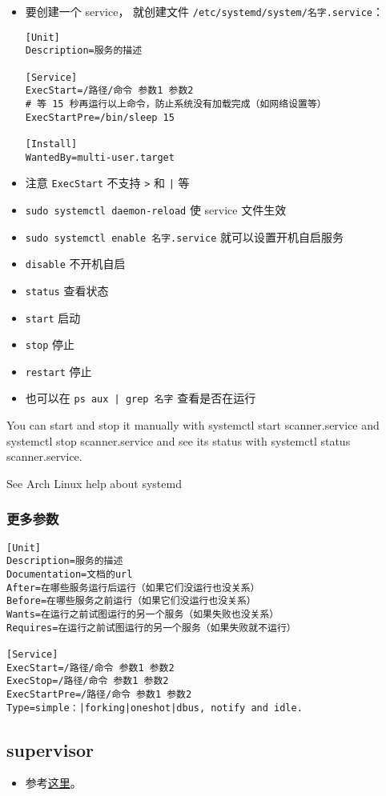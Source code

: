 
\begin{issues}
\issueDraft
\end{issues}

\begin{itemize}
\item 要创建一个 service， 就创建文件 \verb|/etc/systemd/system/名字.service|：
\begin{lstlisting}[language=none,caption=名字.service]
[Unit]
Description=服务的描述

[Service]
ExecStart=/路径/命令 参数1 参数2
# 等 15 秒再运行以上命令，防止系统没有加载完成（如网络设置等）
ExecStartPre=/bin/sleep 15

[Install]
WantedBy=multi-user.target
\end{lstlisting}
\item 注意 \verb|ExecStart| 不支持 \verb|>| 和 \verb`|` 等
\item \verb|sudo systemctl daemon-reload| 使 service 文件生效
\item \verb|sudo systemctl enable 名字.service| 就可以设置开机自启服务
\item \verb|disable| 不开机自启
\item \verb|status| 查看状态
\item \verb|start| 启动
\item \verb|stop| 停止
\item \verb|restart| 停止
\item 也可以在 \verb`ps aux | grep 名字` 查看是否在运行
\end{itemize}

You can start and stop it manually with systemctl start scanner.service and systemctl stop scanner.service and see its status with systemctl status scanner.service.

See Arch Linux help about systemd

\subsubsection{更多参数}
\begin{lstlisting}[language=none,caption=名字.service]
[Unit]
Description=服务的描述
Documentation=文档的url
After=在哪些服务运行后运行（如果它们没运行也没关系）
Before=在哪些服务之前运行（如果它们没运行也没关系）
Wants=在运行之前试图运行的另一个服务（如果失败也没关系）
Requires=在运行之前试图运行的另一个服务（如果失败就不运行）

[Service]
ExecStart=/路径/命令 参数1 参数2
ExecStop=/路径/命令 参数1 参数2
ExecStartPre=/路径/命令 参数1 参数2
Type=simple：|forking|oneshot|dbus, notify and idle.
\end{lstlisting}


\subsection{supervisor}
\begin{itemize}
\item 参考\href{https://www.digitalocean.com/community/tutorials/how-to-install-and-manage-supervisor-on-ubuntu-and-debian-vps}{这里}。
\end{itemize}
